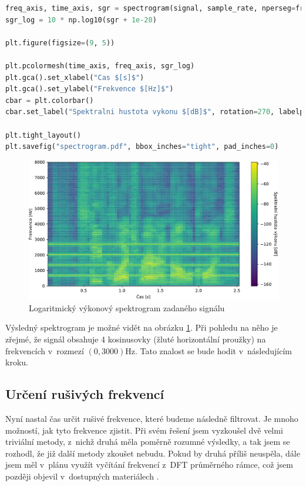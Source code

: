 \documentclass[a4paper, 11pt, final]{article}
\begin{document}
\begin{lstlisting}[language=Python, caption=Zobrazení spektrogramu zadaného signálu, label={code:spectrogram}]
freq_axis, time_axis, sgr = spectrogram(signal, sample_rate, nperseg=frame_size, noverlap=frame_overlap)
sgr_log = 10 * np.log10(sgr + 1e-20)

plt.figure(figsize=(9, 5))

plt.pcolormesh(time_axis, freq_axis, sgr_log)
plt.gca().set_xlabel("Cas $[s]$")
plt.gca().set_ylabel("Frekvence $[Hz]$")
cbar = plt.colorbar()
cbar.set_label("Spektralni hustota vykonu $[dB]$", rotation=270, labelpad=15)

plt.tight_layout()
plt.savefig("spectrogram.pdf", bbox_inches="tight", pad_inches=0)
\end{lstlisting}

\begin{figure}[ht]
    \centering
    \includegraphics[width=\textwidth]{img/04-spectrogram.pdf}
    \caption{Logaritmický výkonový spektrogram zadaného signálu}
    \label{fig:signal-spectrogram}
\end{figure}

Výsledný spektrogram je možné vidět na obrázku \ref{fig:signal-spectrogram}. Při pohledu na něho je zřejmé, že signál obsahuje 4 kosinusovky (žluté horizontální proužky) na frekvencích v~rozmezí $\left(0, 3000\right) \si{\hertz}$. Tato znalost se bude hodit v~následujícím kroku.

\subsection{Určení rušivých frekvencí}

Nyní nastal čas určit rušivé frekvence, které budeme následně filtrovat. Je mnoho možností, jak tyto frekvence zjistit. Při svém řešení jsem vyzkoušel dvě velmi triviální metody, z~nichž druhá měla poměrně rozumné výsledky, a tak jsem se rozhodl, že již další metody zkoušet nebudu. Pokud by druhá příliš neuspěla, dále jsem měl v~plánu využít vyčítání frekvencí z~DFT průměrného rámce, což jsem později objevil v~dostupných materiálech \cite{zmolikova-demo}.
\end{document}

